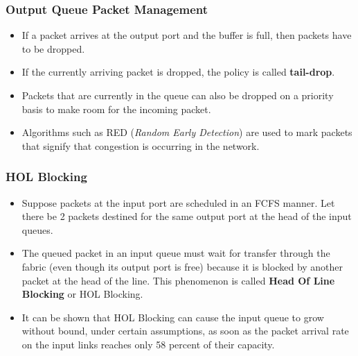 \documentclass[a4paper]{article}
\theoremstyle{plain}
\theoremstyle{definition}
\begin{document}
\subsubsection{Output Queue Packet Management}
\begin{itemize}
    \item If a packet arrives at the output port and the buffer is full, then packets have to be dropped. 
    
    \item If the currently arriving packet is dropped, the policy is called \textbf{tail-drop}. 
    
    \item Packets that are currently in the queue can also be dropped on a priority basis to make room for the incoming packet. 
    
    \item Algorithms such as RED (\textit{Random Early Detection}) are used to mark packets that signify that congestion is occurring in the network.
\end{itemize}

\subsubsection{HOL Blocking}
\begin{itemize}
    \item Suppose packets at the input port are scheduled in an FCFS manner. Let there be 2 packets destined for the same output port at the head of the input queues. 
    
    \item The queued packet in an input queue must wait for transfer through the fabric (even though its output port is free) because it is blocked by another packet at the head of the line. This phenomenon is called \textbf{Head Of Line Blocking} or HOL Blocking. 
    
    \item It can be shown that HOL Blocking can cause the input queue to grow without bound, under certain assumptions, as soon as the packet arrival rate on the input links reaches only 58 percent of their capacity.
\end{itemize}
\end{document}
